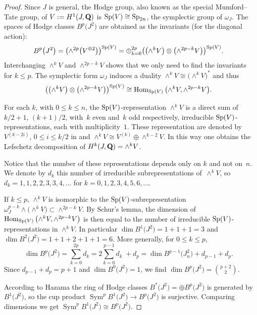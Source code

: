 \documentclass[pdftex]{sigma}
\numberwithin{equation}{section}
\begin{document}
\begin{proof}Since $J$ is general, the Hodge group, also known as the special Mumford--Tate group,
of $V:=H^1(J,{\bf Q})$ is ${\rm Sp}(V)\cong {\rm Sp}_{2n}$, the symplectic group of $\omega_J$.
The spaces of Hodge classes $B^p\big(J^2\big)$ are obtained as the invariants (for the diagonal action):
\[
B^p\big(J^2\big) = \big({\wedge}^{2p}\big(V^{\oplus 2}\big)\big)^{{\rm Sp}(V)} =
\oplus_{k=0}^{2p} \big(\big({\wedge}^kV\big)\otimes\big({\wedge}^{2p-k}V\big)\big)^{{\rm Sp}(V)}.
\]
Interchanging $\wedge^kV$ and $\wedge^{2p-k}V$ shows that we only need to find the
invariants for $k\leq p$.
The symplectic form $\omega_J$ induces a duality $\wedge^kV\cong\big({\wedge}^kV\big)^*$ and thus
\[
\big(\big({\wedge}^kV\big)\otimes\big({\wedge}^{2p-k}V\big)\big)^{{\rm Sp}(V)} \cong
\operatorname{Hom}_{{\rm Sp}(V)}\big({\wedge}^kV,\wedge^{2p-k}V\big).
\]

For each $k$, with $0\leq k\leq n$,
the ${\rm Sp}(V)$-representation $\wedge^kV$ is a direct sum of $k/2+1$, $(k+1)/2$,
with~$k$ even and~$k$ odd respectively, irreducible ${\rm Sp}(V)$-representations,
each with multiplicity~$1$.
These representation are denoted by $V^{(k-2i)}$, $0\leq i\leq k/2$ in \cite[Theorem~17.5]{FH} and
$\wedge^kV\cong V^{(k)}\oplus\wedge^{k-2}V$.
In this way one obtains the Lefschetz decomposition \cite[p.~122]{GH} of $H^k(J,{\bf Q})=\wedge^kV$.

Notice that the number of these representations depends only on $k$ and not on~$n$.
We denote by $d_k$ this number of irreducible subrepresentations of~$\wedge^kV$,
so $d_k=1,1,2,2,3,3,4,\dots$ for $k=0,1,2,3,4,5,6,\dots$.

If $k\leq p$, $\wedge^kV$ is isomorphic to the ${\rm Sp}(V)$-subrepresentation
$\omega_J^{p-k}\wedge \big({\wedge}^kV\big)\subset \wedge^{2p-k}V$.
By Schur's lemma, the dimension of $\operatorname{Hom}_{{\rm Sp}(V)}\big({\wedge}^kV,\wedge^{2p-k}V\big)$ is then equal to
the number of irreducible ${\rm Sp}(V)$-representations in $\wedge^kV$.
In particular $\dim B^1\big(J^2\big)=1+1+1=3$ and $\dim B^2\big(J^2\big)=1+1+2+1+1=6$.
More generally, for $0\leq k\leq p$,
\[
\dim B^p\big(J^2\big) = \sum_{k=0}^{2p} d_k =
2\sum_{k=0}^{p-1}d_k\;+ d_{p} = \dim B^{p-1}\big(J_{n}^2\big) + d_{p-1} + d_p.
\]
Since $d_{p-1}+d_p=p+1$ and $\dim B^0\big(J^2\big)=1$, we find $\dim B^p\big(J^2\big)=\binom{p+2}{2}$.

According to Hazama \cite[Proposition 1.6]{Haz}
the ring of Hodge classes $B^*\big(J^2\big)=\oplus B^p\big(J^2\big)$ is generated by $B^1\big(J^2\big)$,
so the cup product $\operatorname{Sym}^pB^1\big(J^2\big)\rightarrow B^p\big(J^2\big)$ is surjective. Comparing dimensions we
get $\operatorname{Sym}^pB^1\big(J^2\big)\cong B^p\big(J^2\big)$.


\end{proof}
\end{document}
